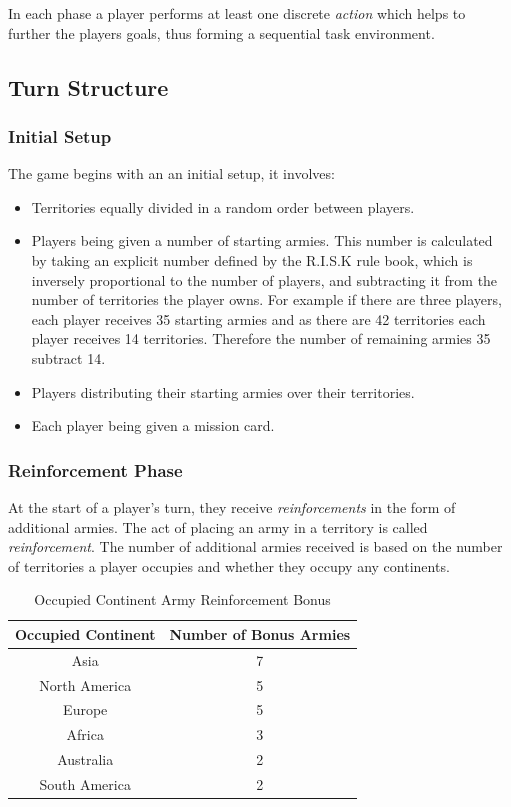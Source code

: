 \documentclass[parskip]{cs4rep}
\begin{document}
In each phase a player performs at least one discrete \textit{action} which helps to further the players goals, thus forming a sequential task environment.

\subsection{Turn Structure}

\subsubsection{Initial Setup}

The game begins with an an initial setup, it involves:

\begin{itemize}
\item
Territories equally divided in a random order between players.
\item
Players being given a number of starting armies. This number is calculated by taking an explicit number defined by the R.I.S.K rule book, which is inversely proportional to the number of players, and subtracting it from the number of territories the player owns. For example if there are three players, each player receives 35 starting armies and as there are 42 territories each player receives 14 territories. Therefore the number of remaining armies 35 subtract 14.
\item
Players distributing their starting armies over their territories.
\item
Each player being given a mission card.
\end{itemize}

\subsubsection{Reinforcement Phase}

At the start of a player's turn, they receive \textit{reinforcements} in the form of additional armies. The act of placing an army in a territory is called \textit{reinforcement}.  The number of additional armies received is based on the number of territories a player occupies and whether they occupy any continents.
\newline

\begin{table}[ht]
\centering
\begin{tabular}{|c|c|}
\hline 
\textbf{Occupied Continent} & \textbf{Number of Bonus Armies} \\ 
\hline 
Asia & 7 \\ 
\hline 
North America & 5 \\ 
\hline 
Europe & 5 \\ 
\hline 
Africa & 3 \\
\hline
Australia & 2 \\
\hline  
South America & 2 \\
\hline 
\end{tabular}
\caption{Occupied Continent Army Reinforcement Bonus}
\label{table:continent-bonus}
\end{table}
\end{document}
